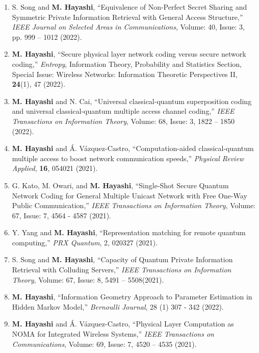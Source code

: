 \documentclass[a4paper,12pt,oneside]{article}
\begin{document}
\begin{enumerate}
\item
S. Song and \textbf{M. Hayashi},
``Equivalence of Non-Perfect Secret Sharing and Symmetric Private Information Retrieval with General Access Structure,''
{\em IEEE Journal on Selected Areas in Communications},
Volume: 40, Issue: 3, pp. 999 – 1012 (2022).

\item
\textbf{M. Hayashi},
``Secure physical layer network coding versus secure network coding,''
{\em Entropy},
Information Theory, Probability and Statistics Section, Special Issue: 
Wireless Networks: Information Theoretic Perspectives II, 
{\bf 24}(1), 47 (2022).

\item
\textbf{M. Hayashi} and N. Cai,
``Universal classical-quantum superposition coding and universal classical-quantum multiple access channel coding,''
{\em IEEE Transactions on Information Theory},
Volume: 68, Issue: 3, 1822 – 1850 (2022).

\item
\textbf{M. Hayashi} and \'{A}. V\'{a}zquez-Castro,
``Computation-aided classical-quantum multiple access to boost network communication speeds,''
{\em Physical Review Applied},
{\bf 16}, 054021 (2021).

\item
G. Kato, M. Owari, and \textbf{M. Hayashi},
``Single-Shot Secure Quantum Network Coding for General Multiple Unicast Network with Free One-Way Public Communication,''
{\em IEEE Transactions on Information Theory}, 
Volume: 67, Issue: 7, 4564 - 4587 (2021).

\item
Y. Yang and \textbf{M. Hayashi},
``Representation matching for remote quantum computing,''
{\em PRX Quantum},
2, 020327 (2021).

\item
S. Song and \textbf{M. Hayashi},
``Capacity of Quantum Private Information Retrieval with Colluding Servers,''
{\em IEEE Transactions on Information Theory}, 
Volume: 67, Issue: 8, 5491 -- 5508(2021).

\item
\textbf{M. Hayashi},
``Information Geometry Approach to Parameter Estimation in Hidden Markov Model,''
{\em Bernoulli Journal},
28 (1) 307 - 342 (2022).

\item
\textbf{M. Hayashi} and \'{A}. V\'{a}zquez-Castro,
``Physical Layer Computation as NOMA for Integrated Wireless Systems,''
{\em IEEE Transactions on Communications},
Volume: 69, Issue: 7, 4520 -- 4535 (2021).


\end{enumerate}
\end{document}
